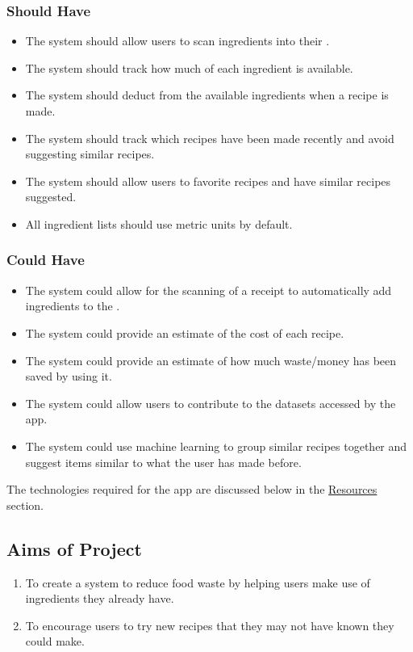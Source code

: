 \documentclass[../CHEFCookingHelper.tex]{subfiles}
\begin{document}
\subsubsection{Should Have}
\begin{itemize}
    \item The system should allow users to scan ingredients into their \virtualfridge.
    \item The system should track how much of each ingredient is available.
    \item The system should deduct from the available ingredients when a recipe is made.
    \item The system should track which recipes have been made recently and avoid suggesting similar recipes.
    \item The system should allow users to favorite recipes and have similar recipes suggested.
    \item All ingredient lists should use metric units by default.
\end{itemize}

\subsubsection{Could Have}
\begin{itemize}
    \item The system could allow for the scanning of a receipt to automatically add ingredients to the \virtualfridge.
    \item The system could provide an estimate of the cost of each recipe.
    \item The system could provide an estimate of how much waste/money has been saved by using it.
    \item The system could allow users to contribute to the datasets accessed by the app.
    \item The system could use machine learning to group similar recipes together and suggest items similar to what the user has made before.
\end{itemize}

The technologies required for the \chef{} app are discussed below in the \hyperref[sec:resources_statement]{Resources} section.

\subsection{Aims of Project}

\begin{enumerate}
    \item To create a system to reduce food waste by helping users make use of ingredients they already have.
    \item To encourage users to try new recipes that they may not have known they could make.
\end{enumerate}
\end{document}
